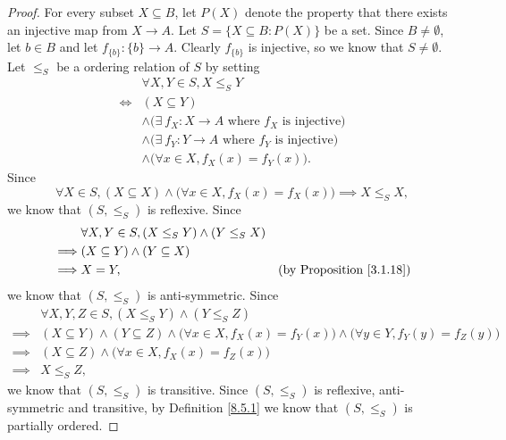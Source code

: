 \begin{proof}
    For every subset \(X \subseteq B\), let \(P(X)\) denote the property that there exists an injective map from \(X \to A\).
    Let \(S = \{X \subseteq B : P(X)\}\) be a set.
    Since \(B \neq \emptyset\), let \(b \in B\) and let \(f_{\{b\}} : \{b\} \to A\).
    Clearly \(f_{\{b\}}\) is injective, so we know that \(S \neq \emptyset\).
    Let \(\leq_S\) be a ordering relation of \(S\) by setting
    \begin{align*}
             & \forall X, Y \in S, X \leq_S Y                                            \\
        \iff & (X \subseteq Y)                                                           \\
             & \land \big(\exists\ f_X : X \to A \text{ where \(f_X\) is injective}\big) \\
             & \land \big(\exists\ f_Y : Y \to A \text{ where \(f_Y\) is injective}\big) \\
             & \land \big(\forall x \in X, f_X(x) = f_Y(x)\big).
    \end{align*}
    Since
    \[
        \forall X \in S, (X \subseteq X) \land \big(\forall x \in X, f_X(x) = f_X(x)\big) \implies X \leq_S X,
    \]
    we know that \((S, \leq_S)\) is reflexive.
    Since
    \begin{align*}
                 & \forall X, Y \in S, (X \leq_S Y) \land (Y \leq_S X)                                        \\
        \implies & (X \subseteq Y) \land (Y \subseteq X)                                                      \\
        \implies & X = Y,                                              & \text{(by Proposition \ref{3.1.18})}
    \end{align*}
    we know that \((S, \leq_S)\) is anti-symmetric.
    Since
    \begin{align*}
                 & \forall X, Y, Z \in S, (X \leq_S Y) \land (Y \leq_S Z)                                                                                  \\
        \implies & (X \subseteq Y) \land (Y \subseteq Z) \land \big(\forall x \in X, f_X(x) = f_Y(x)\big) \land \big(\forall y \in Y, f_Y(y) = f_Z(y)\big) \\
        \implies & (X \subseteq Z) \land \big(\forall x \in X, f_X(x) = f_Z(x)\big)                                                                        \\
        \implies & X \leq_S Z,
    \end{align*}
    we know that \((S, \leq_S)\) is transitive.
    Since \((S, \leq_S)\) is reflexive, anti-symmetric and transitive, by Definition \ref{8.5.1} we know that \((S, \leq_S)\) is partially ordered.


\end{proof}
